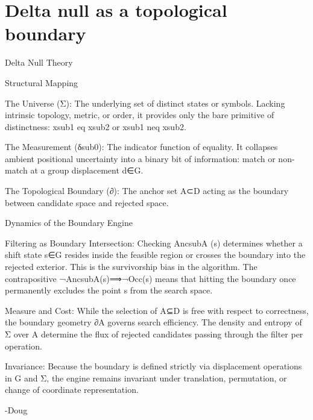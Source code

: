 \chapter{Delta null as a topological boundary}

Delta Null Theory

Structural Mapping

The Universe (Σ): The underlying set of distinct states or symbols. Lacking intrinsic topology, metric, or order, it provides only the bare primitive of distinctness: xsub1 eq xsub2 or xsub1 neq xsub2.

The Measurement (δsub0): The indicator function of equality. It collapses ambient positional uncertainty into a binary bit of information: match or non-match at a group displacement d∈G.

The Topological Boundary (∂): The anchor set A⊂D acting as the boundary between candidate space and rejected space.

Dynamics of the Boundary Engine

Filtering as Boundary Intersection: Checking AncsubA (s) determines whether a shift state s∈G resides inside the feasible region or crosses the boundary into the rejected exterior. This is the survivorship bias in the algorithm. The contrapositive ¬AncsubA(s)⟹¬Occ(s) means that hitting the boundary once permanently excludes the point s from the search space.

Measure and Cost: While the selection of A⊆D is free with respect to correctness, the boundary geometry ∂A governs search efficiency. The density and entropy of Σ over A determine the flux of rejected candidates passing through the filter per operation.

Invariance: Because the boundary is defined strictly via displacement operations in G and Σ, the engine remains invariant under translation, permutation, or change of coordinate representation.

-Doug

